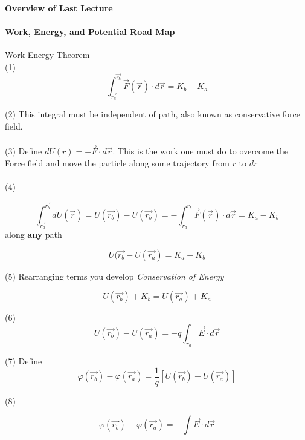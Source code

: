 \documentclass[svgnames]{article}   	%
\begin{document}
\paragraph{Overview of Last Lecture} 

\paragraph{Work, Energy, and Potential Road Map}

Work Energy Theorem \\ 
(1)
\[
  \int_{\vec{r_a}}^{\vec{r_b}} \vec{F}(\vec{r}) \cdot d\vec{r} = K_b - K_a 
\]

(2) \hspace{10px} This integral must be independent of path, also known as conservative force
field. \\\\

(3) \hspace{10px} Define $dU(r) = - \vec{F} \cdot d\vec{r}$. This is the work one must do to
overcome the Force field and move the particle along some trajectory from $r$
to $dr$ \\\\

(4) 

\[
  \int_{\vec{r_a}}^{\vec{r_b}} dU(\vec{r}) = U(\vec{r_b}) - U(\vec{r_b})
  = - \int_{r_a}^{r_b} \vec{F}(\vec{r}) \cdot d\vec{r} = K_a - K_b
\]
along \textbf{any} path

\vspace{5px} \[
U(\vec{r_b} - U(\vec{r_a}) = K_a - K_b   
\] \vspace{5px}

(5) \hspace{10px} Rearranging terms you develop \textit{Conservation of Energy} 

\[
U(\vec{r_b}) + K_b = U(\vec{r_a}) + K_a  
\]

(6) \hspace{10px}
\[
  U(\vec{r_b}) - U(\vec{r_a}) = -q \int_{r_a} \vec{E} \cdot d\vec{r}  
\]

(7) \hspace{10px} Define  
\[
\varphi(\vec{r_b}) - \varphi(\vec{r_a})
= \frac{1}{q} [U(\vec{r_b}) - U(\vec{r_a})]  
\]

(8) 


\begin{tcolorbox}	
  
  \[
    \varphi(\vec{r_b}) - \varphi(\vec{r_a}) = -\int \vec{E} \cdot d\vec{r}   
  \]
  
  

\end{tcolorbox}	
\vspace{5px}
\end{document}
